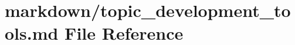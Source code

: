 \hypertarget{topic__development__tools_8md}{}\section{markdown/topic\+\_\+development\+\_\+tools.md File Reference}
\label{topic__development__tools_8md}
